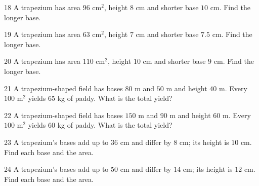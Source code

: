\gap
\begin{probbox}{18}{\relax}
A trapezium has area $96$ cm$^2$, height $8$ cm and shorter base $10$ cm. Find the longer base.
\end{probbox}
\gap
\begin{probbox}{19}{\relax}
A trapezium has area $63$ cm$^2$, height $7$ cm and shorter base $7.5$ cm. Find the longer base.
\end{probbox}
\gap
\begin{probbox}{20}{\relax}
A trapezium has area $110$ cm$^2$, height $10$ cm and shorter base $9$ cm. Find the longer base.
\end{probbox}
\gap
\begin{probbox}{21}{\relax}
A trapezium-shaped field has bases $80$ m and $50$ m and height $40$ m. Every $100$ m$^2$ yields $65$ kg of paddy. What is the total yield?
\end{probbox}
\gap
\begin{probbox}{22}{\relax}
A trapezium-shaped field has bases $150$ m and $90$ m and height $60$ m. Every $100$ m$^2$ yields $60$ kg of paddy. What is the total yield?
\end{probbox}
\gap
\begin{probbox}{23}{\relax}
A trapezium's bases add up to $36$ cm and differ by $8$ cm; its height is $10$ cm. Find each base and the area.
\end{probbox}
\gap
\begin{probbox}{24}{\relax}
A trapezium's bases add up to $50$ cm and differ by $14$ cm; its height is $12$ cm. Find each base and the area.
\end{probbox}
